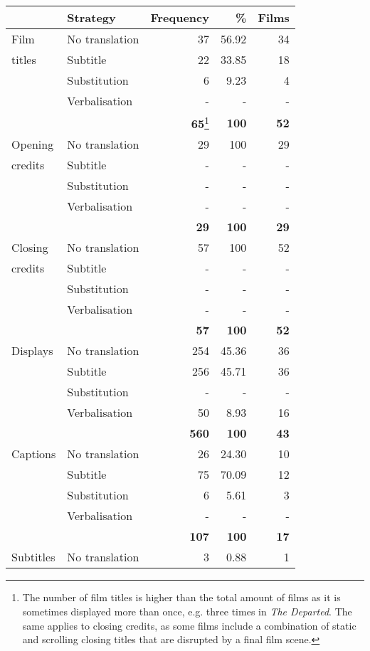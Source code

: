 \begin{table}
\small
\begin{tabularx}{\textwidth}{lQrrr}
\lsptoprule
{} &  Strategy &  Frequency &  \% &  Films\\
\midrule 
{Film } & No translation & 37 & 56.92 & 34\\
titles& Subtitle & 22 & 33.85 & 18\\
 & Substitution & 6 & 9.23 & 4\\
 & Verbalisation & - & - & -\\
 &  & \textbf{65}\footnote{The number of film titles is higher than the total amount of films as it is sometimes displayed more than once, e.g. three times in \textit{The Departed}. The same applies to closing credits, as some films include a combination of static and scrolling closing titles that are disrupted by a final film scene.} &  \textbf{100} &  \textbf{52}\\
{Opening } & No translation & 29 & 100 & 29\\
credits& Subtitle & - & - & -\\
 & Substitution & - & - & -\\
 & Verbalisation & - & - & -\\
 &  &  \textbf{29} &  \textbf{100} &  \textbf{29}\\
{Closing } & No translation & 57 & 100 & 52\\
credits& Subtitle & - & - & -\\
 & Substitution & - & - & -\\
 & Verbalisation & - & - & -\\
 &  &  \textbf{57} &  \textbf{100} &  \textbf{52}\\
{Displays} & No translation & 254 & 45.36 & 36\\
& Subtitle & 256 & 45.71 & 36\\
 & Substitution & - & - & -\\
 & Verbalisation & 50 & 8.93 & 16\\
 &  &  \textbf{560} &  \textbf{100} &  \textbf{43}\\
{Captions} & No translation & 26 & 24.30 & 10\\
& Subtitle & 75 & 70.09 & 12\\
 & Substitution & 6 & 5.61 & 3\\
 & Verbalisation & - & - & -\\
 &  &  \textbf{107} &  \textbf{100} &  \textbf{17}\\
{Subtitles} & No translation & 3 & 0.88 & 1\\

\end{tabularx}
\end{table}
